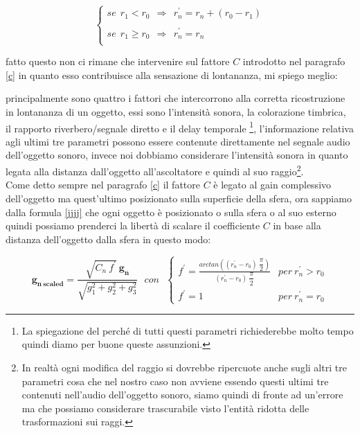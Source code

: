 \documentclass[12pt,a4paper]{report}
\begin{document}
\begin{equation}
\left\{\begin{matrix}
se\ \  r_1 < r_0\ \ \Rightarrow \ \ r_n^{\prime} = r_n+(r_0 - r_1) \\
\\
se\ \  r_1 \geq r_0\ \ \Rightarrow \ \ r_n^{\prime} = r_n\\
\end{matrix}\right.
\label{jjjj}
\end{equation}

fatto questo non ci rimane che intervenire sul fattore $C$ introdotto nel paragrafo \ref{c} in quanto esso contribuisce alla sensazione di lontananza, mi spiego meglio:

principalmente sono quattro i fattori che intercorrono alla corretta ricostruzione in lontananza di un oggetto, essi sono l'intensità sonora, la colorazione timbrica, il rapporto riverbero/segnale diretto e il delay temporale \footnote{La spiegazione del perché di tutti questi parametri richiederebbe molto tempo quindi diamo per buone queste assunzioni.}, l'informazione relativa agli ultimi tre parametri possono essere contenute direttamente nel segnale audio dell'oggetto sonoro, invece noi dobbiamo considerare l'intensità sonora in quanto legata alla distanza dall'oggetto all'ascoltatore e quindi al suo raggio\footnote{In realtà ogni modifica del raggio si dovrebbe ripercuote anche sugli altri tre parametri cosa che nel nostro caso non avviene essendo questi ultimi tre contenuti nell'audio dell'oggetto sonoro, siamo quindi di fronte ad un'errore ma che possiamo considerare trascurabile visto l'entità ridotta delle trasformazioni sui raggi.}.\\

Come detto sempre nel paragrafo \ref{c} il fattore $C$ è legato al gain complessivo dell'oggetto ma quest'ultimo posizionato sulla superficie della sfera, ora sappiamo dalla formula \ref{jjjj} che ogni oggetto è posizionato o sulla sfera o al suo esterno quindi possiamo prenderci la libertà di scalare il coefficiente $C$ in base alla distanza dell'oggetto dalla sfera in questo modo:

\begin{equation}
\boldsymbol{g_{n\ scaled}} = \dfrac{\sqrt{C_n \ f^{\prime}}\ \boldsymbol{g_n}}{\sqrt{g_1^2 +g_2^2 + g_3^2}} \ \ \ con \ \ \ \left\{\begin{matrix}
f^{\prime}= \frac{arctan\left((r_n^{\prime}-r_0)\ \dfrac{\pi}{2}\right)}{(r_n^{\prime}-r_0)\ \dfrac{\pi}{2}} & per\ r_n^{\prime}>r_0
\\
f^{\prime}=1 & per\ r_n^{\prime}=r_0
\end{matrix}\right.
\label{kkkk}
\end{equation}
\end{document}
